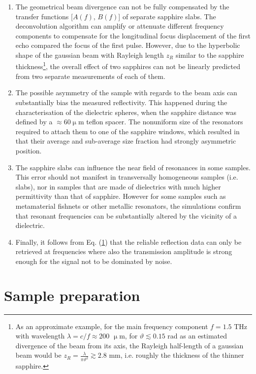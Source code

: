 \begin{enumerate}
\item{The geometrical beam divergence can not be fully compensated by the transfer functions [$A(f)$, $B(f)$] of separate sapphire slabs. The deconvolution algorithm can amplify or attenuate different frequency components to compensate for the  longitudinal focus displacement of the first echo compared the focus of the first pulse. However, due to the hyperbolic shape of the gaussian beam with Rayleigh length $z_{R}$ similar to the sapphire thickness\footnote{As an approximate example, for the main frequency component $f = 1.5$ THz with wavelength $\lambda = c / f \approx 200$ $\upmu$m, for $\vartheta \lesssim 0.15$ rad as an estimated divergence of the beam from its axis, the Rayleigh half-length of a gaussian beam would be $z_{R} = \frac{\lambda}{\pi \vartheta^{2}} \gtrsim 2.8$ mm, i.e. roughly the thickness of the thinner sapphire.}, the overall effect of two sapphires can not be linearly predicted from two separate measurements of each of them.} 
 \item{The possible asymmetry of the sample with regards to the beam axis can substantially bias the measured reflectivity. This happened during the characterisation of the dielectric spheres, when the sapphire distance was defined by a $\approx$60$\upmu$m teflon spacer. The nonuniform size of the resonators required to attach them to one of the sapphire windows, which resulted in that their average and sub-average size fraction had strongly asymmetric position. } 
 \item{The sapphire slabs can influence the near field of resonances in some samples. This error should not manifest in transversally homogeneous samples (i.e. slabs), nor in samples that are made of dielectrics with much higher permittivity than that of sapphire. However for some samples such as metamaterial fishnets or other metallic resonators, the simulations confirm that resonant frequencies can be substantially altered by the vicinity of a dielectric. }
 \item{Finally, it follows from Eq. (\ref{}) %
 that the reliable reflection data can only be retrieved at frequencies where also the transmission amplitude is strong enough for the signal not to be dominated by noise. }
 \end{enumerate}

\section{Sample preparation} %

